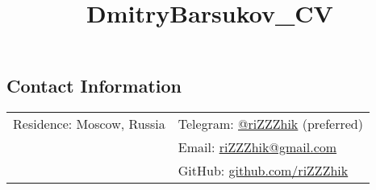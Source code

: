 \documentclass[margin,line]{res}
\begin{document}
\title{DmitryBarsukov_CV}

\begin{resume}

\section{\sc Contact Information}

\vspace{.05in}
\begin{tabular}{@{}p{2.30in}p{3in}}
Residence: Moscow, Russia
& Telegram: \href{https://t.me/riZZZhik}{@riZZZhik} (preferred) \\
& Email: \href{mailto:riZZZhik@gmail.com}{riZZZhik@gmail.com} \\
& GitHub: \href{https://github.com/riZZZhik}{github.com/riZZZhik} \\
\end{tabular}





\end{resume}
\end{document}
